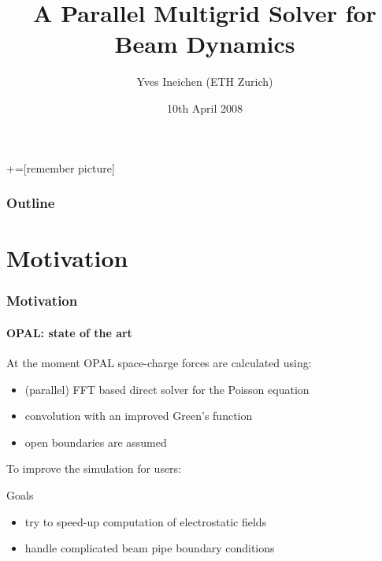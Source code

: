 \documentclass[xcolor=pdftex,table,10pt]{beamer}
\title{A Parallel Multigrid Solver for Beam Dynamics}
\author{Yves Ineichen (ETH Zurich)}
\institute{\textbf{Master Thesis} \\ Supervisor: Andreas Adelmann (PSI), Peter Arbenz (ETH)}
\date{10th April 2008}
\begin{document}
+=[remember picture]

\everymath{\displaystyle}

	\lstset{language=C++, basicstyle=\small}

	\begin{frame}
		\titlepage
	\end{frame}
	
	\begin{frame}
	  \frametitle{Outline}
	  \tableofcontents
	\end{frame}

	\section{Motivation}

	\begin{frame}
		\frametitle{Motivation}
		\framesubtitle{OPAL: state of the art}

		At the moment OPAL space-charge forces are calculated using:

		\begin{itemize}
			\item (parallel) FFT based direct solver for the Poisson equation
			\item convolution with an improved Green's function
			\item open boundaries are assumed
		\end{itemize}

		\pause
		\vspace{0.7cm}

		To improve the simulation for users:
		
		\vspace{0.3cm}

		\begin{alertblock}{Goals}
		\begin{itemize}
			\item try to speed-up computation of electrostatic fields
			\item handle complicated beam pipe boundary conditions
		\end{itemize}
		\end{alertblock}

	\end{frame}
	
\end{document}
